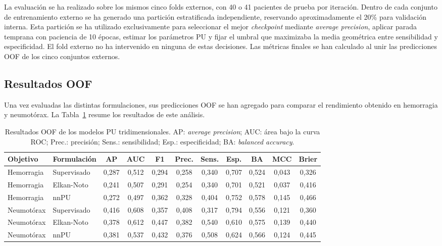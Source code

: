 La evaluación se ha realizado sobre los mismos cinco folds externos, con 40 o 41 pacientes de prueba por iteración. Dentro de cada conjunto de entrenamiento externo se ha generado una partición estratificada independiente, reservando aproximadamente el 20\% para validación interna. Esta partición se ha utilizado exclusivamente para seleccionar el mejor \textit{checkpoint} mediante \textit{average precision}, aplicar parada temprana con paciencia de 10 épocas, estimar los parámetros PU y fijar el umbral que maximizaba la media geométrica entre sensibilidad y especificidad. El fold externo no ha intervenido en ninguna de estas decisiones. Las métricas finales se han calculado al unir las predicciones OOF de los cinco conjuntos externos.

\subsection{Resultados OOF}

Una vez evaluadas las distintas formulaciones, sus predicciones OOF se han agregado para comparar el rendimiento obtenido en hemorragia y neumotórax. La Tabla~\ref{tab:pu3d_resultados_oof} resume los resultados de este análisis.

\begin{table}[!htbp]
\centering
\caption{Resultados OOF de los modelos PU tridimensionales. AP: \textit{average precision}; AUC: área bajo la curva ROC; Prec.: precisión; Sens.: sensibilidad; Esp.: especificidad; BA: \textit{balanced accuracy}.}
\label{tab:pu3d_resultados_oof}
\scriptsize
\begin{adjustbox}{max width=\textwidth}
\begin{tabular}{llccccccccc}
\toprule
\textbf{Objetivo} & \textbf{Formulación} & \textbf{AP} & \textbf{AUC} & \textbf{F1} & \textbf{Prec.} & \textbf{Sens.} & \textbf{Esp.} & \textbf{BA} & \textbf{MCC} & \textbf{Brier} \\
\midrule
Hemorragia & Supervisado & 0,287 & 0,512 & 0,294 & 0,258 & 0,340 & 0,707 & 0,524 & 0,043 & 0,326 \\
Hemorragia & Elkan-Noto & 0,241 & 0,507 & 0,291 & 0,254 & 0,340 & 0,701 & 0,521 & 0,037 & 0,416 \\
Hemorragia & nnPU & 0,272 & 0,497 & 0,362 & 0,328 & 0,404 & 0,752 & 0,578 & 0,145 & 0,466 \\
\midrule
Neumotórax & Supervisado & 0,416 & 0,608 & 0,357 & 0,408 & 0,317 & 0,794 & 0,556 & 0,121 & 0,360 \\
Neumotórax & Elkan-Noto & 0,378 & 0,612 & 0,447 & 0,382 & 0,540 & 0,610 & 0,575 & 0,139 & 0,440 \\
Neumotórax & nnPU & 0,381 & 0,537 & 0,432 & 0,376 & 0,508 & 0,624 & 0,566 & 0,124 & 0,445 \\
\bottomrule
\end{tabular}
\end{adjustbox}
\end{table}

